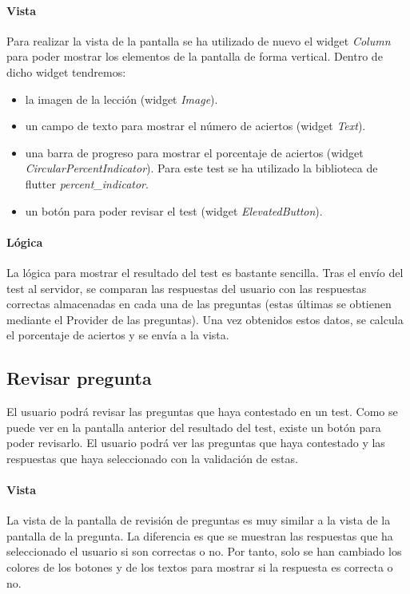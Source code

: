 \paragraph*{Vista}
\label{sec:vista}

Para realizar la vista de la pantalla se ha utilizado de nuevo el widget \textit{Column} para poder mostrar los elementos de la pantalla de forma vertical. 
Dentro de dicho widget tendremos:
\begin{itemize}
  \item la imagen de la lección (widget \textit{Image}).
  \item un campo de texto para mostrar el número de aciertos (widget \textit{Text}).
  \item una barra de progreso para mostrar el porcentaje de aciertos (widget \textit{CircularPercentIndicator}). Para este test se ha utilizado la biblioteca de flutter \textit{percent\_indicator}.
  \item un botón para poder revisar el test (widget \textit{ElevatedButton}).
\end{itemize}

\paragraph*{Lógica}
\label{sec:logica}
La lógica para mostrar el resultado del test es bastante sencilla.
Tras el envío del test al servidor, se comparan las respuestas del usuario con las respuestas correctas almacenadas en cada una de las preguntas (estas últimas se obtienen mediante el Provider de las preguntas). 
Una vez obtenidos estos datos, se calcula el porcentaje de aciertos y se envía a la vista.



\subsection{Revisar pregunta}
\label{sec:pregunta}
El usuario podrá revisar las preguntas que haya contestado en un test. Como se puede ver en la pantalla anterior del resultado del test, existe un botón para poder revisarlo. El usuario podrá ver las preguntas que haya contestado y las respuestas que haya seleccionado con la validación de estas.

\paragraph*{Vista}
\label{sec:vista}
La vista de la pantalla de revisión de preguntas es muy similar a la vista de la pantalla de la pregunta. La diferencia es que se muestran las respuestas que ha seleccionado el usuario si son correctas o no.
Por tanto, solo se han cambiado los colores de los botones y de los textos para mostrar si la respuesta es correcta o no.


